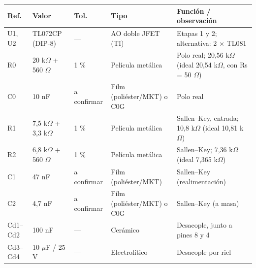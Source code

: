 \begin{tabular}{@{}p{1.2cm}p{3.0cm}p{1.8cm}p{2.9cm}p{5.4cm}@{}}
\toprule
Ref. & Valor & Tol. & Tipo & Función / observación \\
\midrule
U1, U2 & TL072CP (DIP-8) & — & AO doble JFET (TI) & Etapas 1 y 2; alternativa: 2 $\times$ TL081 \\
R0 & 20 k$\Omega$ + 560 $\Omega$ & 1 \% & Película metálica & Polo real; 20,56 k$\Omega$ (ideal 20,54 k$\Omega$, con Rs = 50 $\Omega$) \\
C0 & 10 nF & a confirmar & Film (poliéster/MKT) o C0G & Polo real \\
R1 & 7,5 k$\Omega$ + 3,3 k$\Omega$ & 1 \% & Película metálica & Sallen–Key, entrada; 10,8 k$\Omega$ (ideal 10,81 k$\Omega$) \\
R2 & 6,8 k$\Omega$ + 560 $\Omega$ & 1 \% & Película metálica & Sallen–Key; 7,36 k$\Omega$ (ideal 7,365 k$\Omega$) \\
C1 & 47 nF & a confirmar & Film (poliéster/MKT) & Sallen–Key (realimentación) \\
C2 & 4,7 nF & a confirmar & Film (poliéster/MKT) o C0G & Sallen–Key (a masa) \\
Cd1–Cd2 & 100 nF & — & Cerámico & Desacople, junto a pines 8 y 4 \\
Cd3–Cd4 & 10 $\mu$F / 25 V & — & Electrolítico & Desacople por riel \\
\bottomrule
\end{tabular}